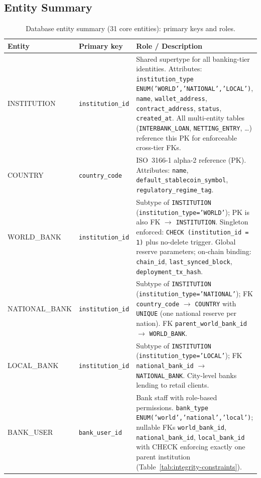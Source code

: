 \documentclass[12pt,a4paper]{report}
\newcommand{\tableheadcolor}{\rowcolor{TableHeadBg}}
\begin{document}
\subsection{Entity Summary}

\begin{table}[H]
\centering
\caption[Database entity summary (31 core entities)]{Database entity summary (31 core entities): primary keys and roles.}
\label{tab:db-entities}
\small
\begin{tabular}{@{}p{2.6cm}p{3.4cm}p{7.0cm}@{}}
\toprule
\tableheadcolor
\textbf{Entity} & \textbf{Primary key} & \textbf{Role / Description} \\
\midrule
INSTITUTION & \texttt{institution\_id} & Shared supertype for all banking-tier identities. Attributes: \texttt{institution\_type} \texttt{ENUM('WORLD','NATIONAL','LOCAL')}, \texttt{name}, \texttt{wallet\_address}, \texttt{contract\_address}, \texttt{status}, \texttt{created\_at}. All multi-entity tables (\texttt{INTERBANK\_LOAN}, \texttt{NETTING\_ENTRY}, \ldots) reference this PK for enforceable cross-tier FKs. \\
COUNTRY & \texttt{country\_code} & ISO~3166-1 alpha-2 reference (PK). Attributes: \texttt{name}, \texttt{default\_stablecoin\_symbol}, \texttt{regulatory\_regime\_tag}. \\
WORLD\_BANK & \texttt{institution\_id} & Subtype of \texttt{INSTITUTION} (\texttt{institution\_type='WORLD'}); PK is also FK $\to$ \texttt{INSTITUTION}. Singleton enforced: \texttt{CHECK (institution\_id = 1)} plus no-delete trigger. Global reserve parameters; on-chain binding: \texttt{chain\_id}, \texttt{last\_synced\_block}, \texttt{deployment\_tx\_hash}. \\
NATIONAL\_BANK & \texttt{institution\_id} & Subtype of \texttt{INSTITUTION} (\texttt{institution\_type='NATIONAL'}); FK \texttt{country\_code} $\to$ \texttt{COUNTRY} with \texttt{UNIQUE} (one national reserve per nation). FK \texttt{parent\_world\_bank\_id} $\to$ \texttt{WORLD\_BANK}. \\
LOCAL\_BANK & \texttt{institution\_id} & Subtype of \texttt{INSTITUTION} (\texttt{institution\_type='LOCAL'}); FK \texttt{national\_bank\_id} $\to$ \texttt{NATIONAL\_BANK}. City-level banks lending to retail clients. \\
BANK\_USER & \texttt{bank\_user\_id} & Bank staff with role-based permissions. \texttt{bank\_type} \texttt{ENUM('world','national','local')}; nullable FKs \texttt{world\_bank\_id}, \texttt{national\_bank\_id}, \texttt{local\_bank\_id} with CHECK enforcing exactly one parent institution (Table~\ref{tab:integrity-constraints}). \\

\end{tabular}
\end{table}
\end{document}
